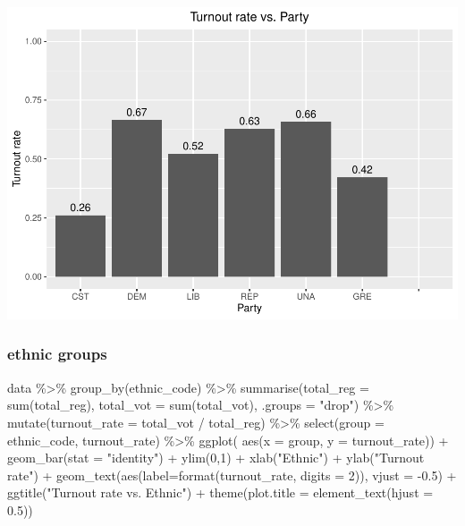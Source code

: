 \documentclass[
]{article}
\newenvironment{Shaded}{\begin{snugshade}}{\end{snugshade}}
\newcommand{\AttributeTok}[1]{\textcolor[rgb]{0.77,0.63,0.00}{#1}}
\newcommand{\DecValTok}[1]{\textcolor[rgb]{0.00,0.00,0.81}{#1}}
\newcommand{\FloatTok}[1]{\textcolor[rgb]{0.00,0.00,0.81}{#1}}
\newcommand{\FunctionTok}[1]{\textcolor[rgb]{0.00,0.00,0.00}{#1}}
\newcommand{\NormalTok}[1]{#1}
\newcommand{\SpecialCharTok}[1]{\textcolor[rgb]{0.00,0.00,0.00}{#1}}
\newcommand{\StringTok}[1]{\textcolor[rgb]{0.31,0.60,0.02}{#1}}
\begin{document}
\includegraphics{CS2_files/figure-latex/unnamed-chunk-10-1.pdf}

\hypertarget{ethnic-groups}{%
\subsubsection{ethnic groups}\label{ethnic-groups}}

\begin{Shaded}
\begin{Highlighting}[]
\NormalTok{data }\SpecialCharTok{\%\textgreater{}\%}
  \FunctionTok{group\_by}\NormalTok{(ethnic\_code) }\SpecialCharTok{\%\textgreater{}\%}
  \FunctionTok{summarise}\NormalTok{(}\AttributeTok{total\_reg =} \FunctionTok{sum}\NormalTok{(total\_reg),}
            \AttributeTok{total\_vot =} \FunctionTok{sum}\NormalTok{(total\_vot), }\AttributeTok{.groups =} \StringTok{"drop"}\NormalTok{) }\SpecialCharTok{\%\textgreater{}\%}
  \FunctionTok{mutate}\NormalTok{(}\AttributeTok{turnout\_rate =}\NormalTok{ total\_vot }\SpecialCharTok{/}\NormalTok{ total\_reg) }\SpecialCharTok{\%\textgreater{}\%}
  \FunctionTok{select}\NormalTok{(}\AttributeTok{group =}\NormalTok{ ethnic\_code, turnout\_rate) }\SpecialCharTok{\%\textgreater{}\%}
  \FunctionTok{ggplot}\NormalTok{( }\FunctionTok{aes}\NormalTok{(}\AttributeTok{x =}\NormalTok{ group, }\AttributeTok{y =}\NormalTok{ turnout\_rate)) }\SpecialCharTok{+}
  \FunctionTok{geom\_bar}\NormalTok{(}\AttributeTok{stat =} \StringTok{"identity"}\NormalTok{) }\SpecialCharTok{+}
  \FunctionTok{ylim}\NormalTok{(}\DecValTok{0}\NormalTok{,}\DecValTok{1}\NormalTok{) }\SpecialCharTok{+}
  \FunctionTok{xlab}\NormalTok{(}\StringTok{"Ethnic"}\NormalTok{) }\SpecialCharTok{+} \FunctionTok{ylab}\NormalTok{(}\StringTok{"Turnout rate"}\NormalTok{) }\SpecialCharTok{+}
  \FunctionTok{geom\_text}\NormalTok{(}\FunctionTok{aes}\NormalTok{(}\AttributeTok{label=}\FunctionTok{format}\NormalTok{(turnout\_rate, }\AttributeTok{digits =} \DecValTok{2}\NormalTok{)), }\AttributeTok{vjust =} \SpecialCharTok{{-}}\FloatTok{0.5}\NormalTok{) }\SpecialCharTok{+}
  \FunctionTok{ggtitle}\NormalTok{(}\StringTok{"Turnout rate vs. Ethnic"}\NormalTok{) }\SpecialCharTok{+}
    \FunctionTok{theme}\NormalTok{(}\AttributeTok{plot.title =} \FunctionTok{element\_text}\NormalTok{(}\AttributeTok{hjust =} \FloatTok{0.5}\NormalTok{))}
\end{Highlighting}
\end{Shaded}
\end{document}
